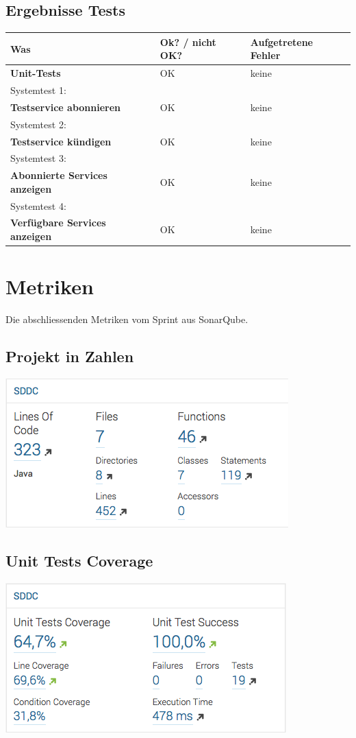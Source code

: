 \documentclass[11pt]{scrartcl}
\begin{document}
\subsection{Ergebnisse Tests}
\begin{tabularx}{\linewidth}{l l l}
\textbf{Was} & \textbf{Ok? / nicht OK?} & \textbf{Aufgetretene Fehler}\\
\hline
\textbf{Unit-Tests} & {\color{green} OK}  & keine\\
\hline
Systemtest 1: & & \\
\textbf{Testservice abonnieren} & {\color{green} OK} & keine\\
\hline
Systemtest 2: & & \\
\textbf{Testservice kündigen} & {\color{green} OK}  & keine\\
\hline
Systemtest 3: & & \\
\textbf{Abonnierte Services anzeigen} & {\color{green} OK}  & keine\\
\hline
Systemtest 4: & & \\
\textbf{Verfügbare Services anzeigen} & {\color{green} OK}  & keine\\
\hline



\end{tabularx}

\newpage

\section{Metriken}
Die abschliessenden Metriken vom Sprint aus SonarQube.
\subsection{Projekt in Zahlen}
\includegraphics[]{loc}

\subsection{Unit Tests Coverage}
\includegraphics[]{coverage}
\end{document}
